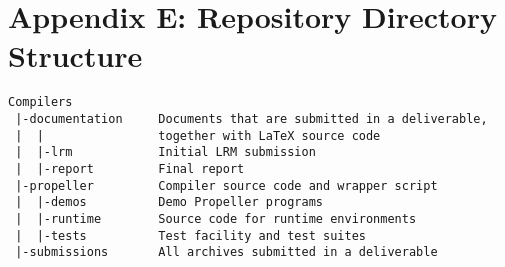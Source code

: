 \section{Appendix E: Repository Directory Structure}
\begin{verbatim}
Compilers
 |-documentation     Documents that are submitted in a deliverable,
 |  |                together with LaTeX source code
 |  |-lrm            Initial LRM submission
 |  |-report         Final report
 |-propeller         Compiler source code and wrapper script
 |  |-demos          Demo Propeller programs
 |  |-runtime        Source code for runtime environments
 |  |-tests          Test facility and test suites
 |-submissions       All archives submitted in a deliverable
 
\end{verbatim}
